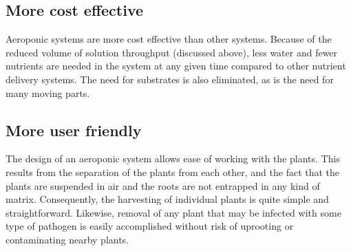 \documentclass{article}
\begin{document}
\subsection{More cost effective}
Aeroponic systems are more cost effective than other systems. Because of the reduced volume of solution throughput (discussed above), less water and fewer nutrients are needed in the system at any given time compared to other nutrient delivery systems. The need for substrates is also eliminated, as is the need for many moving parts.
\subsection{More user friendly}
The design of an aeroponic system allows ease of working with the plants. This results from the separation of the plants from each other, and the fact that the plants are suspended in air and the roots are not entrapped in any kind of matrix. Consequently, the harvesting of individual plants is quite simple and straightforward. Likewise, removal of any plant that may be infected with some type of pathogen is easily accomplished without risk of uprooting or contaminating nearby plants.
\end{document}
